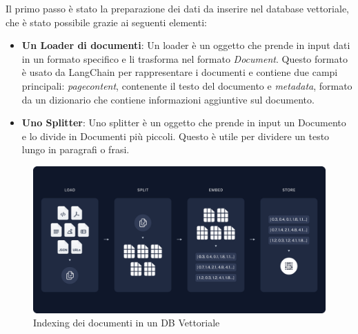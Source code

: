 Il primo passo è stato la preparazione dei dati da inserire nel database vettoriale, che è stato possibile grazie ai seguenti elementi:
\begin{itemize}
    \item \textbf{Un Loader di documenti}: Un loader è un oggetto che prende in input dati in un formato specifico e li trasforma nel formato \textit{Document}. Questo formato è usato da LangChain per rappresentare i documenti e contiene due campi principali: \textit{page\textunderscore content}, contenente il testo del documento e \textit{metadata}, formato da un dizionario che contiene informazioni aggiuntive sul documento.
    \item \textbf{Uno Splitter}: Uno splitter è un oggetto che prende in input un Documento e lo divide in Documenti più piccoli. Questo è utile per dividere un testo lungo in paragrafi o frasi.
\end{itemize}
\begin{figure}[!t]
    \centering
    \includegraphics[width=\textwidth]{Images/cap3/rag.png}
    \caption{Indexing dei documenti in un DB Vettoriale \cite{langchainragindexing}}
    \label{fig:indexing}
\end{figure}

